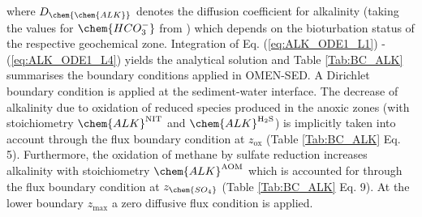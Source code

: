 \documentclass[gmd, manuscript]{copernicus}
\begin{document}
where $D_\chem{\chem{ALK}}$ denotes the diffusion coefficient for alkalinity (taking the values for $\chem{HCO_3^{-}}$ from \citet{schulz_quantification_2006}) which depends on the bioturbation status of the respective geochemical zone. 
Integration of Eq. (\ref{eq:ALK_ODE1_L1}) - (\ref{eq:ALK_ODE1_L4}) yields the analytical solution and Table \ref{Tab:BC_ALK} summarises the boundary conditions applied in OMEN-SED. 
A Dirichlet boundary condition is applied at the sediment-water interface. The decrease of alkalinity due to oxidation of reduced species produced in the anoxic zones 
(with stoichiometry $\chem{ALK}^\mathrm{NIT}$ and $\chem{ALK}^\mathrm{H_2S}$) is implicitly taken into account through the flux boundary condition at $z_{\mathrm{ox}}$ (Table \ref{Tab:BC_ALK} Eq. 5). 
Furthermore, the oxidation of methane by sulfate reduction increases alkalinity with stoichiometry $\chem{ALK}^\mathrm{AOM}$ which is accounted for through the flux boundary condition at $z_{\chem{SO_4}}$ (Table \ref{Tab:BC_ALK} Eq. 9). 
At the lower boundary $z_\mathrm{max}$ a zero diffusive flux condition is applied. 
\end{document}
